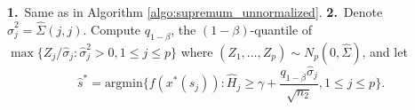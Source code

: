 \documentclass[mnsc,blindrev]{informs4} %
\begin{document}
\begin{algorithm}
\caption{$V$: Normalized Gaussian Supremum Validator}
\label{algo:supremum_normalized}
\begin{algorithmic}
\vspace{1ex}


\STATE \textbf{1.}~Same as in Algorithm \ref{algo:supremum_unnormalized}.
\STATE \textbf{2.}~Denote $\hat\sigma_j^2=\hat \Sigma(j,j)$. Compute $q_{1-\beta}$, the $(1-\beta)$-quantile of $\max\{Z_j/\hat\sigma_j:\hat\sigma_j^2>0,1\leq j\leq p\}$ where $(Z_1,\ldots,Z_p)\sim N_p(0,\hat \Sigma)$, and let
\begin{equation}\label{validate:gs normalized}
    \hat s^* = \text{argmin}\Bigg\{f(x^*(s_j)):\hat H_j\geq \gamma + \frac{ q_{1-\beta}\hat\sigma_j}{\sqrt{n_2}}, 1\leq j\leq p\Bigg\}.
\end{equation}
\end{algorithmic}
\end{algorithm}

\end{document}

